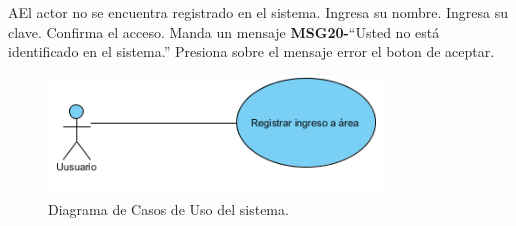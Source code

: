 		\begin{UCtrayectoriaA}{A}{El actor no se encuentra registrado en el sistema.}
			\UCpaso[\UCactor] Ingresa su nombre.
			\UCpaso[\UCactor] Ingresa su clave.
			\UCpaso[\UCactor] Confirma el acceso.
			\UCpaso Manda un mensaje  {\bf MSG20-}``Usted no está identificado en el sistema.''
			\UCpaso[\UCactor] Presiona sobre el mensaje error el boton de aceptar.
		\end{UCtrayectoriaA}

\begin{figure}[htbp!]
		\centering
			\includegraphics[width=0.8\textwidth]{images/registraIngresoArea}
		\caption{Diagrama de Casos de Uso del sistema.}
	\end{figure}
	
